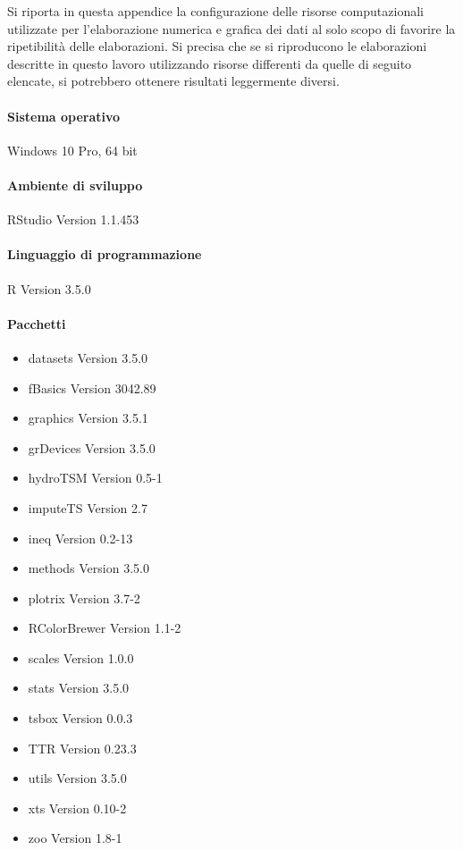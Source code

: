 Si riporta in questa appendice la configurazione delle risorse computazionali utilizzate per l'elaborazione numerica e grafica dei dati al solo scopo di favorire la ripetibilità delle elaborazioni. Si precisa che se si riproducono le elaborazioni descritte in questo lavoro utilizzando risorse differenti da quelle di seguito elencate, si potrebbero ottenere risultati leggermente diversi. 

\paragraph*{Sistema operativo}
Windows 10 Pro, 64 bit

\paragraph*{Ambiente di sviluppo}
RStudio\texttrademark{} Version 1.1.453

\paragraph*{Linguaggio di programmazione}
R Version 3.5.0

\paragraph*{Pacchetti}
\begin{itemize}
	\item datasets Version 3.5.0
	\item fBasics Version 3042.89
	\item graphics Version 3.5.1
	\item grDevices Version 3.5.0
	\item hydroTSM Version 0.5-1
	\item imputeTS Version 2.7
	\item ineq Version 0.2-13
	\item methods Version 3.5.0
	\item plotrix Version 3.7-2
	\item RColorBrewer Version 1.1-2
	\item scales Version 1.0.0
	\item stats Version 3.5.0
	\item tsbox Version 0.0.3
	\item TTR Version 0.23.3
	\item utils Version 3.5.0
	\item xts Version 0.10-2
	\item zoo Version 1.8-1
\end{itemize}